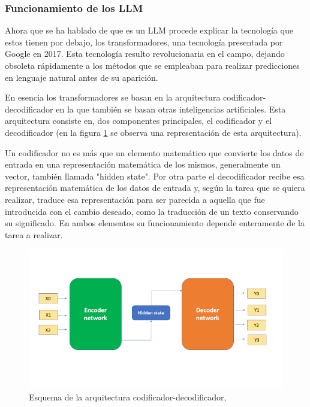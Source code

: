 \subsubsection{Funcionamiento de los LLM}

Ahora que se ha hablado de que es un LLM procede explicar la tecnología que estos tienen por debajo, los transformadores, una tecnología presentada por Google en 2017. Esta tecnología resulto revolucionaria en el campo, dejando obsoleta rápidamente a los métodos que se empleaban para realizar predicciones en lenguaje natural antes de su aparición.

En esencia los transformadores se basan en la arquitectura codificador-decodificador en la que también se basan otras inteligencias artificiales. Esta arquitectura consiste en, dos componentes principales, el codificador y el decodificador (en la figura \ref{fig:coddecod} se observa una representación de esta arquitectura). 

Un codificador no es más que un elemento matemático que convierte los datos de entrada en una representación matemática de los mismos, generalmente un vector, también llamada "hidden state". Por otra parte el decodificador recibe esa representación matemática de los datos de entrada y, según la tarea que se quiera realizar, traduce esa representación para ser parecida a aquella que fue introducida con el cambio deseado, como la traducción de un texto conservando su significado. En ambos elementos su funcionamiento depende enteramente de la tarea a realizar.

\begin{figure}[h]
    \centering
    \includegraphics[width=1\textwidth]{img/encoder-decoder-architecture.png}
    \caption{Esquema de la arquitectura codificador-decodificador, \cite{kumar_demystifying_2024}}
    \label{fig:coddecod}
\end{figure}

